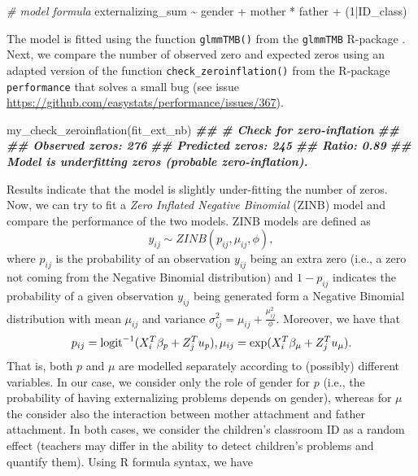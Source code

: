 \documentclass[
]{book}
\newenvironment{Shaded}{\begin{snugshade}}{\end{snugshade}}
\newcommand{\CommentTok}[1]{\textcolor[rgb]{0.56,0.35,0.01}{\textit{#1}}}
\newcommand{\DecValTok}[1]{\textcolor[rgb]{0.00,0.00,0.81}{#1}}
\newcommand{\DocumentationTok}[1]{\textcolor[rgb]{0.56,0.35,0.01}{\textbf{\textit{#1}}}}
\newcommand{\FunctionTok}[1]{\textcolor[rgb]{0.00,0.00,0.00}{#1}}
\newcommand{\NormalTok}[1]{#1}
\newcommand{\SpecialCharTok}[1]{\textcolor[rgb]{0.00,0.00,0.00}{#1}}
\begin{document}
\begin{Shaded}
\begin{Highlighting}[]
\CommentTok{\# model formula}
\NormalTok{externalizing\_sum }\SpecialCharTok{\textasciitilde{}}\NormalTok{ gender }\SpecialCharTok{+}\NormalTok{ mother }\SpecialCharTok{*}\NormalTok{ father }\SpecialCharTok{+}\NormalTok{ (}\DecValTok{1}\SpecialCharTok{|}\NormalTok{ID\_class)}
\end{Highlighting}
\end{Shaded}

The model is fitted using the function \texttt{glmmTMB()} from the \texttt{glmmTMB} R-package \citep{brooksGlmmTMBBalancesSpeed2017}. Next, we compare the number of observed zero and expected zeros using an adapted version of the function \texttt{check\_zeroinflation()} from the R-package \texttt{performance} \citep{ludeckePerformancePackageAssessment2021} that solves a small bug (see issue \url{https://github.com/easystats/performance/issues/367}).

\begin{Shaded}
\begin{Highlighting}[]
\FunctionTok{my\_check\_zeroinflation}\NormalTok{(fit\_ext\_nb)}
\DocumentationTok{\#\# \# Check for zero{-}inflation}
\DocumentationTok{\#\# }
\DocumentationTok{\#\#    Observed zeros: 276}
\DocumentationTok{\#\#   Predicted zeros: 245}
\DocumentationTok{\#\#             Ratio: 0.89}
\DocumentationTok{\#\# Model is underfitting zeros (probable zero{-}inflation).}
\end{Highlighting}
\end{Shaded}

Results indicate that the model is slightly under-fitting the number of zeros. Now, we can try to fit a \emph{Zero Inflated Negative Binomial} (ZINB) model and compare the performance of the two models. ZINB models are defined as
\[
y_{ij} \sim ZINB(p_{ij}, \mu_{ij}, \phi),
\]
where \(p_{ij}\) is the probability of an observation \(y_{ij}\) being an extra zero (i.e., a zero not coming from the Negative Binomial distribution) and \(1-p_{ij}\) indicates the probability of a given observation \(y_{ij}\) being generated form a Negative Binomial distribution with mean \(\mu_{ij}\) and variance \(\sigma_{ij}^2 = \mu_{ij} + \frac{\mu_{ij}^2}{\phi}\). Moreover, we have that
\[
p_{ij} = \text{logit}^{-1}(X_i^T\beta_p+ Z_j^Tu_p),\\
\mu_{ij} = \text{exp}(X_i^T\beta_{\mu}+ Z_j^Tu_{\mu}).
\]
That is, both \(p\) and \(\mu\) are modelled separately according to (possibly) different variables. In our case, we consider only the role of gender for \(p\) (i.e., the probability of having externalizing problems depends on gender), whereas for \(\mu\) the consider also the interaction between mother attachment and father attachment. In both cases, we consider the children's classroom ID as a random effect (teachers may differ in the ability to detect children's problems and quantify them). Using R formula syntax, we have
\end{document}
